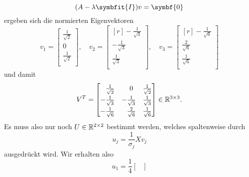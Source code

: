 \begin{example}
    \begin{equation*}
        (A - \lambda\symbfit{I})v = \symbf{0}
    \end{equation*}
    ergeben sich die normierten Eigenvektoren
    \begin{equation*}
        \renewcommand{\arraystretch}{1.4}
        v_1 =
        \begin{bmatrix}
            \frac{1}{\sqrt{2}} \\
            0 \\
            \frac{1}{\sqrt{2}} \\
        \end{bmatrix}, \quad
        v_2 =
        \begin{bmatrix*}[r]
            -\frac{1}{\sqrt{3}} \\
            -\frac{1}{\sqrt{3}} \\
            \frac{1}{\sqrt{3}} \\
        \end{bmatrix*}, \quad
        v_3 =
        \begin{bmatrix*}[r]
            -\frac{1}{\sqrt{6}} \\
            \frac{2}{\sqrt{6}} \\
            \frac{1}{\sqrt{6}} \\
        \end{bmatrix*}
    \end{equation*} 
    und damit
    \begin{equation*}
        \renewcommand{\arraystretch}{1.3}
        V^{T} =
        \begin{bmatrix}
            \phantom{-}\frac{1}{\sqrt{2}} & \phantom{-}0 & \frac{1}{\sqrt{2}} \\
            -\frac{1}{\sqrt{3}} & -\frac{1}{\sqrt{3}} & \frac{1}{\sqrt{3}} \\
            -\frac{1}{\sqrt{6}} & \phantom{-}\frac{2}{\sqrt{6}} & \frac{1}{\sqrt{6}} \\
        \end{bmatrix} \in \R^{3 \times 3}.
    \end{equation*}
    Es muss also nur noch \(U \in \mathbb{R}^{2 \times 2}\) bestimmt werden, welches spaltenweise durch
    \begin{equation*}
        u_j = \frac{1}{\sigma_j}Xv_j 
    \end{equation*}
    ausgedrückt wird.
    Wir erhalten also
    \begin{equation*}
        u_1 = \frac{1}{4}
        \begin{bmatrix}

\end{bmatrix}
\end{equation*}
\end{example}
